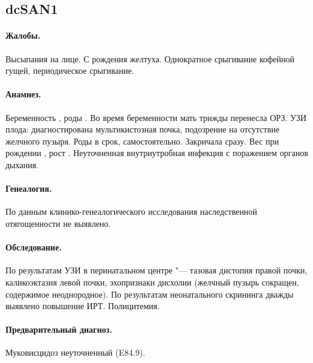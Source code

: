 \documentclass[a4paper,14pt]{extarticle}
\newcommand{\gramm}{г}
\newcommand{\cm}{см}
\begin{document}

\subsection*{dcSAN1}

\paragraph{Жалобы.}
Высыпания на лице.
С рождения желтуха.
Однократное срыгивание кофейной гущей, периодическое срыгивание.

\paragraph{Анамнез.}
Беременность , роды .
Во время беременности мать трижды перенесла ОРЗ.
УЗИ плода: диагностирована мультикистозная почка, подозрение на отсутствие желчного пузыря.
Роды в срок, самостоятельно.
Закричала сразу.
Вес при рождении \numprint[\gramm]{2940}, рост \numprint[\cm]{49}.
Неуточненная внутриутробная инфекция с поражением органов дыхания.

\paragraph{Генеалогия.}
По данным клинико-генеалогического исследования наследственной отягощенности не выявлено.

\paragraph{Обследование.}
По результатам УЗИ в перинатальном центре "--- тазовая дистопия правой почки, каликоэктазия левой почки, эхопризнаки дисхолии (желчный пузырь сокращен, содержимое неоднородное).
По результатам неонатального скрининга дважды выявлено повышение ИРТ.
Полицитемия.

\paragraph{Предварительный диагноз.}
Муковисцидоз неуточненный (E84.9).
\end{document}
